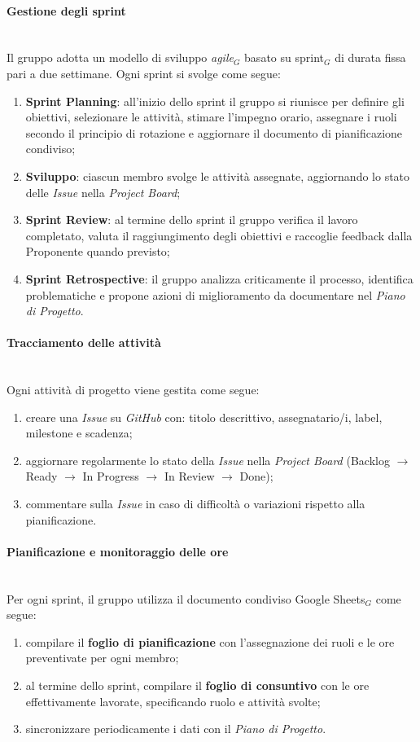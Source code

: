 \documentclass[10pt, letterpaper]{article}
\newcommand{\trisubsection}[1]{\paragraph{#1}\mbox{}\\}
\begin{document}
\trisubsection{Gestione degli sprint}
Il gruppo adotta un modello di sviluppo \textit{agile}$_{G}$ basato su sprint$_{G}$ di durata fissa pari a due settimane. Ogni sprint si svolge come segue:
\begin{enumerate}
    \item \textbf{Sprint Planning}: all'inizio dello sprint il gruppo si riunisce per definire gli obiettivi, selezionare le attività, stimare l'impegno orario, assegnare i ruoli secondo il principio di rotazione e aggiornare il documento di pianificazione condiviso;
    \item \textbf{Sviluppo}: ciascun membro svolge le attività assegnate, aggiornando lo stato delle \textit{Issue} nella \textit{Project Board}; 
    \item \textbf{Sprint Review}: al termine dello sprint il gruppo verifica il lavoro completato, valuta il raggiungimento degli obiettivi e raccoglie feedback dalla Proponente quando previsto;
    \item \textbf{Sprint Retrospective}: il gruppo analizza criticamente il processo, identifica problematiche e propone azioni di miglioramento da documentare nel \textit{Piano di Progetto}.
\end{enumerate}

\trisubsection{Tracciamento delle attività}
Ogni attività di progetto viene gestita come segue:
\begin{enumerate}
    \item creare una \textit{Issue} su \textit{GitHub} con: titolo descrittivo, assegnatario/i, label, milestone e scadenza;
    \item aggiornare regolarmente lo stato della \textit{Issue} nella \textit{Project Board} (Backlog $\to$ Ready $\to$ In Progress $\to$ In Review $\to$ Done);
    \item commentare sulla \textit{Issue} in caso di difficoltà o variazioni rispetto alla pianificazione.
\end{enumerate}

\trisubsection{Pianificazione e monitoraggio delle ore}
Per ogni sprint, il gruppo utilizza il documento condiviso Google Sheets$_{G}$ come segue:
\begin{enumerate}
    \item compilare il \textbf{foglio di pianificazione} con l'assegnazione dei ruoli e le ore preventivate per ogni membro;
    \item al termine dello sprint, compilare il \textbf{foglio di consuntivo} con le ore effettivamente lavorate, specificando ruolo e attività svolte;
    \item sincronizzare periodicamente i dati con il \textit{Piano di Progetto}.
\end{enumerate}
\end{document}

